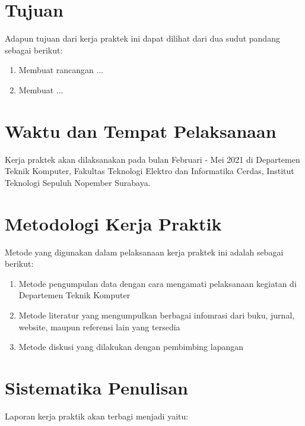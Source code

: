 \section{Tujuan}

Adapun tujuan dari kerja praktek ini dapat dilihat dari dua sudut pandang sebagai berikut:

\begin{enumerate}[nolistsep]

  \item Membuat rancangan ...

  \item Membuat ...

\end{enumerate}


\section{Waktu dan Tempat Pelaksanaan}

Kerja praktek akan dilaksanakan pada bulan Februari - Mei 2021 di Departemen Teknik Komputer, Fakultas Teknologi Elektro dan Informatika Cerdas, Institut Teknologi Sepuluh Nopember Surabaya.

\section{Metodologi Kerja Praktik}

Metode yang digunakan dalam pelaksanaan kerja praktek ini adalah sebagai berikut:

\begin{enumerate}[nolistsep]

  \item Metode pengumpulan data dengan cara mengamati pelaksanaan kegiatan di Departemen Teknik Komputer

  \item Metode literatur yang mengumpulkan berbagai infomrasi dari buku, jurnal, website, maupun referensi lain yang tersedia

  \item Metode diskusi yang dilakukan dengan pembimbing lapangan

\end{enumerate}

\section{Sistematika Penulisan}

Laporan kerja praktik akan terbagi menjadi \lipsum[9][1] yaitu:

